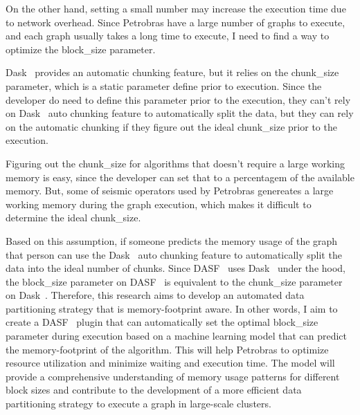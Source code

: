 On the other hand, setting a small number may increase the execution time due to network overhead.
Since Petrobras have a large number of graphs to execute, and each graph usually takes a long time to execute, I need to find a way to optimize the block\_size parameter.

Dask~\cite{dask} provides an automatic chunking feature, but it relies on the chunk\_size parameter, which is a static parameter define prior to execution.
Since the developer do need to define this parameter prior to the execution, they can't rely on Dask~\cite{dask} auto chunking feature to automatically split the data, but they can rely on the automatic chunking if they figure out the ideal chunk\_size prior to the execution.

Figuring out the chunk\_size for algorithms that doesn't require a large working memory is easy, since the developer can set that to a percentagem of the available memory.
But, some of seismic operators used by Petrobras genereates a large working memory during the graph execution, which makes it difficult to determine the ideal chunk\_size.

Based on this assumption, if someone predicts the memory usage of the graph that person can use the Dask~\cite{dask} auto chunking feature to automatically split the data into the ideal number of chunks.
Since \ac{DASF}~\cite{dasf} uses Dask~\cite{dask} under the hood, the block\_size parameter on \ac{DASF}~\cite{dasf} is equivalent to the chunk\_size parameter on Dask~\cite{dask}.
Therefore, this research aims to develop an automated data partitioning strategy that is memory-footprint aware.
In other words, I aim to create a \ac{DASF}~\cite{dasf} plugin that can automatically set the optimal block\_size parameter during execution based on a machine learning model that can predict the memory-footprint of the algorithm.
This will help Petrobras to optimize resource utilization and minimize waiting and execution time.
The model will provide a comprehensive understanding of memory usage patterns for different block sizes and contribute to the development of a more efficient data partitioning strategy to execute a graph in large-scale clusters.
